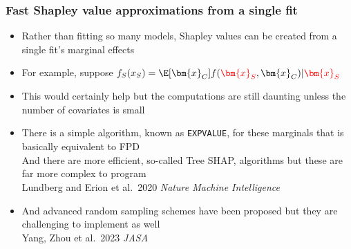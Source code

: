 \documentclass[11pt,dvipsnames,usenames,times]{beamer}
\newcommand*{\blue}[1]{\textcolor{blue}{#1}}%
\begin{document}
\begin{frame}[fragile]\frametitle{Fast Shapley value approximations from a single fit}
\begin{itemize}

\item Rather than fitting so many models, 
Shapley values can be created from a single fit's marginal effects
\item For example, suppose $ f_{S}(x_{S}) = 
\E[{\bm{x}_{C}}]{f(\textcolor{red}{\bm{x}_S}, {\bm{x}_{C}})|\textcolor{red}{\bm{x}_S} } $ 
\item This would certainly help but the computations are still daunting
unless the number of covariates is small
\item There is a simple algorithm, known as {\tt EXPVALUE}, for these marginals
that is basically equivalent to FPD\\
And there are more efficient, so-called Tree SHAP, algorithms
but these are far more complex to program\\
Lundberg and Erion et al.\ 2020 {\it Nature Machine Intelligence}
\item And advanced random sampling schemes have been
proposed 
but they are challenging to implement as well\\
Yang, Zhou et al.\ 2023 {\it JASA}
\end{itemize}
\end{frame}
\end{document}
